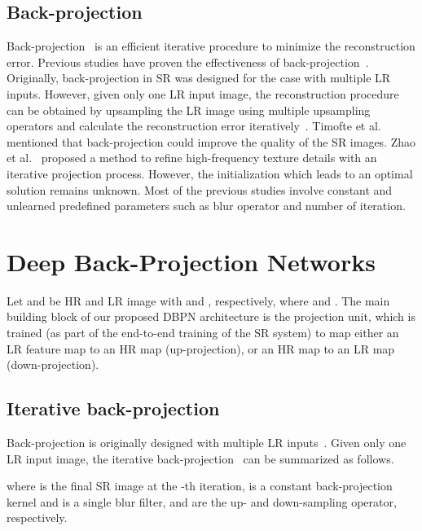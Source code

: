 \documentclass[10pt,journal,compsoc]{IEEEtran}
\begin{document}
\subsection{Back-projection} 
Back-projection~\cite{irani93} is an efficient iterative
procedure to minimize the reconstruction error. Previous studies have
proven the effectiveness of back-projection~\cite{zhao2017iterative,
  haris2017first, dong2009nonlocal, timofte2016seven}. Originally,
back-projection in SR was designed for the case with multiple LR inputs. However, given only one LR input image, the reconstruction procedure can be obtained by upsampling the LR image using multiple upsampling operators and calculate the reconstruction error iteratively~\cite{dai2007bilateral}. Timofte et al.~\cite{timofte2016seven} mentioned that back-projection could improve the quality of the SR images. Zhao et al.~\cite{zhao2017iterative} proposed a method to refine high-frequency texture details with an iterative projection process. However, the initialization which leads to an optimal solution remains unknown. Most of the previous studies involve constant and unlearned predefined parameters such as blur operator and number of iteration. 






 \section{Deep Back-Projection Networks} 
\label{sec:proposed}
Let  and  be HR and LR image with   and , respectively, where  and . The main building block of our proposed DBPN architecture is the
projection unit, which is trained (as part of the end-to-end training
of the SR system) to map either an LR feature map to an HR map
(up-projection), or an HR map to an LR map (down-projection). 

\subsection{Iterative back-projection}
\label{subsec:back_projection}
Back-projection is originally designed with multiple LR inputs~\cite{irani93}. Given only one LR input image, the iterative back-projection~\cite{dai2007bilateral} can be summarized as follows.



where  is the final SR image at the -th iteration, 
 is a constant back-projection kernel and  is a single blur filter, 
 and  are the up- and down-sampling operator, respectively.
\end{document}
